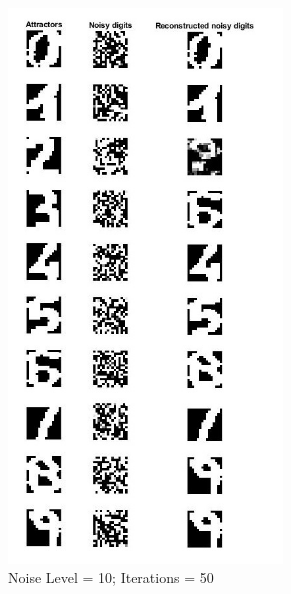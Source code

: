 \begin{figure}[ht]
\begin{subfigure}[b]{0.26\textwidth}
		\includegraphics[height = 1.2\textwidth,width = 0.8\textwidth]{Exercise2/Report/hdr_n10_itr50.jpg}
		\caption{Noise Level = 10; Iterations = 50}\label{fig:hop_digit3}
	\end{subfigure}%
	\begin{subfigure}[b]{0.26\textwidth}
		\centering
		\captionsetup{width=0.8\linewidth, format = hang}

\end{subfigure}
\end{figure}
